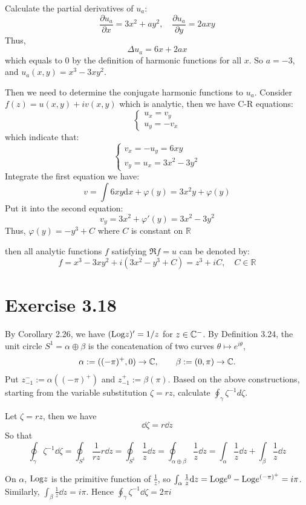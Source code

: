 \documentclass{article}
\begin{document}
\begin{solution}
  Calculate the partial derivatives of $u_a$:
  \[
    \frac{\partial u_a}{\partial x} = 3x^2 + ay^2, \quad
    \frac{\partial u_a}{\partial y} = 2axy
  \]
  Thus,
  \[
    \Delta u_a = 6x+2ax
  \]
  which equals to 0 by the definition of harmonic functions for all
  $x$. So $a = -3$, and $u_a(x,y) = x^3-3xy^2$.

  Then we need to determine the conjugate harmonic functions to
  $u_a$. Consider $f(z) = u(x,y) + iv(x,y)$ which is analytic, then
  we have C-R equations:
  \[
    \begin{cases}
      u_x = v_y \\
      u_y = -v_x
    \end{cases}
  \]
  which indicate that:
  \[
    \begin{cases}
      v_x = -u_y = 6xy \\
      v_y = u_x = 3x^2 - 3y^2
    \end{cases}
  \]
  Integrate the first equation we have:
  \[
    v = \int 6xy \mathrm{d}x + \varphi(y) = 3x^2y+\varphi(y)
  \]
  Put it into the second equation:
  \[
    v_y = 3x^2 + \varphi'(y) = 3x^2 - 3y^2
  \]
  Thus, $\varphi(y) = -y^3 + C$ where $C$ is constant on $\mathbb{R}$

  then all analytic functions $f$ satisfying $\Re f = u$ can be denoted by:
  \[
    f = x^3 - 3xy^2 + i(3x^2 - y^3 + C) = z^3 + iC,\quad C \in \mathbb{R}
  \]

\end{solution}

\section{Exercise 3.18}

By Corollary 2.26, we have $(\mathrm{Log} z)' = 1/z$ for $z \in \mathbb{C}^-$. By
Definition 3.24, the unit circle $S^1 = \alpha \oplus \beta$ is the
concatenation of two curves $\theta \mapsto e^{i\theta}$,
\[
  \alpha := ((-\pi)^+, 0) \to \mathbb{C}, \qquad \beta := (0, \pi) \to \mathbb{C}.
\]
Put $z_{-1}^- := \alpha((-\pi)^+)$ and $z_{-1}^+ := \beta(\pi)$.
Based on the above constructions, starting from the variable
substitution $\zeta = rz$, calculate $\oint_\gamma \zeta^{-1}d\zeta$.

\begin{solution}
  Let $\zeta = rz$, then we have
  \[
    \dd \zeta = r \dd z
  \]
  So that
  \[
    \oint_\gamma \zeta^{-1} \dd \zeta = \oint_{S^1} \frac{1}{rz} r\dd
    z = \oint_{S^1}\frac{1}{z} \dd z = \oint_{\alpha\oplus \beta}
    \frac{1}{z} \dd z =
    \int_{\alpha} \frac{1}{z} \dd z + \int_{\beta} \frac{1}{z} \dd z
  \]

  On $\alpha$, $\mathrm{Log} z$ is the primitive function of $\frac{1}{z}$,
  so $\int_\alpha \frac{1}{z} \mathrm{d} z = \mathrm{Log} e^0 - \mathrm{Log} e^{(-\pi)^+} =
  i\pi$. Similarly, $\int_\beta \frac{1}{z} \dd z = i\pi$. Hence
  $\oint_\gamma \zeta^{-1} \dd \zeta = 2\pi i$
\end{solution}
\end{document}
